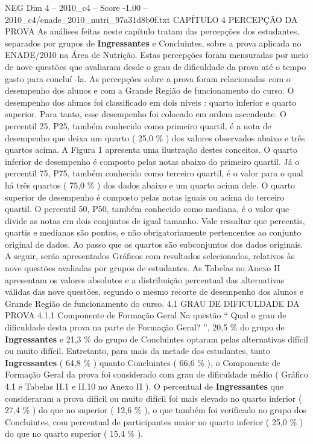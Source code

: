\begin{textsample}{NEG Dim 4 – 2010\_c4 – Score -1.00 – 2010\_c4/enade\_2010\_nutri\_97a31d8b0f.txt}  \label{ex:f4_neg_064}
CAPÍTULO 4 PERCEPÇÃO DA PROVA As análises feitas neste capítulo tratam das percepções dos estudantes, separados por grupos de \textbf{Ingressantes} e Concluintes, sobre a prova aplicada no ENADE/2010 na Área de Nutrição.
Estas percepções foram mensuradas por meio de nove questões que avaliaram desde o grau de dificuldade da prova até o tempo gasto para concluí -la.
As percepções sobre a prova foram relacionadas com o desempenho dos alunos e com a Grande Região de funcionamento do curso.
O desempenho dos alunos foi classificado em dois níveis : quarto inferior e quarto superior.
Para tanto, esse desempenho foi colocado em ordem ascendente.
O percentil 25, P25, também conhecido como primeiro quartil, é a nota de desempenho que deixa um quarto ( 25,0 \% ) dos valores observados abaixo e três quartos acima.
A Figura 1 apresenta uma ilustração destes conceitos.
O quarto inferior de desempenho é composto pelas notas abaixo do primeiro quartil.
Já o percentil 75, P75, também conhecido como terceiro quartil, é o valor para o qual há três quartos ( 75,0 \% ) dos dados abaixo e um quarto acima dele.
O quarto superior de desempenho é composto pelas notas iguais ou acima do terceiro quartil.
O percentil 50, P50, também conhecido como mediana, é o valor que divide as notas em dois conjuntos de igual tamanho.
Vale ressaltar que percentis, quartis e medianas são pontos, e não obrigatoriamente pertencentes ao conjunto original de dados.
Ao passo que os quartos são subconjuntos dos dados originais.
A seguir, serão apresentados Gráficos com resultados selecionados, relativos às nove questões avaliadas por grupos de estudantes.
As Tabelas no Anexo II apresentam os valores absolutos e a distribuição percentual das alternativas válidas das nove questões, segundo o mesmo recorte de desempenho dos alunos e Grande Região de funcionamento do curso. 4.1 GRAU DE DIFICULDADE DA PROVA 4.1.1 Componente de Formação Geral Na questão “ Qual o grau de dificuldade desta prova na parte de Formação Geral? ”, 20,5 \% do grupo de \textbf{Ingressantes} e 21,3 \% do grupo de Concluintes optaram pelas alternativas difícil ou muito difícil.
Entretanto, para mais da metade dos estudantes, tanto \textbf{Ingressantes} ( 64,8 \% ) quanto Concluintes ( 66,6 \% ), o Componente de Formação Geral da prova foi considerado com grau de dificuldade médio ( Gráfico 4.1 e Tabelas II.1 e II.10 no Anexo II ).
O percentual de \textbf{Ingressantes} que consideraram a prova difícil ou muito difícil foi mais elevado no quarto inferior ( 27,4 \% ) do que no superior ( 12,6 \% ), o que também foi verificado no grupo dos Concluintes, com percentual de participantes maior no quarto inferior ( 25,0 \% ) do que no quarto superior ( 15,4 \% ).

\end{textsample}
